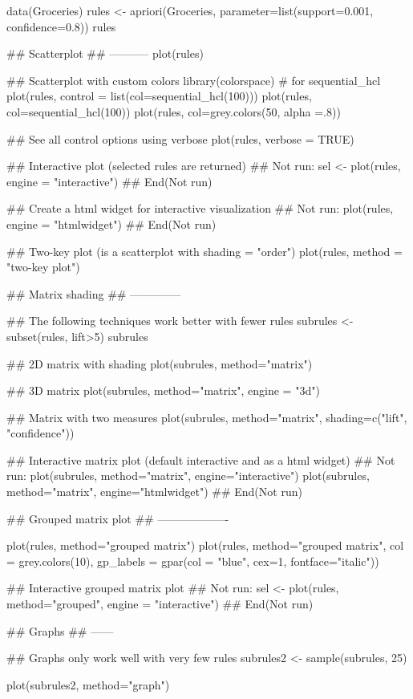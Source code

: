 \documentclass[letterpaper]{book}
\begin{document}
\begin{Examples}
\begin{ExampleCode}
data(Groceries)
rules <- apriori(Groceries, parameter=list(support=0.001, confidence=0.8))
rules

## Scatterplot
## -----------
plot(rules)

## Scatterplot with custom colors
library(colorspace) # for sequential_hcl
plot(rules, control = list(col=sequential_hcl(100)))
plot(rules, col=sequential_hcl(100))
plot(rules, col=grey.colors(50, alpha =.8))

## See all control options using verbose
plot(rules, verbose = TRUE)

## Interactive plot (selected rules are returned)
## Not run: 
sel <- plot(rules, engine = "interactive")
## End(Not run)

## Create a html widget for interactive visualization
## Not run: 
plot(rules, engine = "htmlwidget")
## End(Not run)

## Two-key plot (is a scatterplot with shading = "order")
plot(rules, method = "two-key plot")

  
## Matrix shading
## --------------

## The following techniques work better with fewer rules
subrules <- subset(rules, lift>5)
subrules

## 2D matrix with shading
plot(subrules, method="matrix")

## 3D matrix
plot(subrules, method="matrix", engine = "3d")

## Matrix with two measures
plot(subrules, method="matrix", shading=c("lift", "confidence"))

## Interactive matrix plot (default interactive and as a html widget)
## Not run: 
plot(subrules, method="matrix", engine="interactive")
plot(subrules, method="matrix", engine="htmlwidget")
## End(Not run)

## Grouped matrix plot
## -------------------

plot(rules, method="grouped matrix")
plot(rules, method="grouped matrix", 
  col = grey.colors(10), 
  gp_labels = gpar(col = "blue", cex=1, fontface="italic"))

## Interactive grouped matrix plot
## Not run: 
sel <- plot(rules, method="grouped", engine = "interactive")
## End(Not run)

## Graphs
## ------

## Graphs only work well with very few rules
subrules2 <- sample(subrules, 25)

plot(subrules2, method="graph")


\end{ExampleCode}
\end{Examples}
\end{document}
